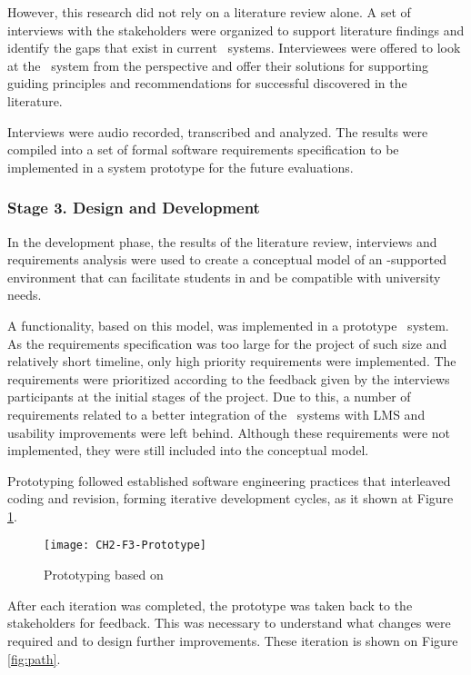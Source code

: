 However, this research did not rely on a literature review alone. A set of
interviews with the stakeholders were organized to support literature findings
and identify the gaps that exist in current \ep~systems. Interviewees were
offered to look at the \ep~system from the \LLLs perspective and offer their
solutions for supporting guiding principles and recommendations for successful
\LLLs discovered in the literature.

Interviews were audio recorded, transcribed and analyzed. The results were
compiled into a set of formal software requirements specification to be
implemented in a system prototype for the future evaluations.

\subsubsection{Stage 3. Design and Development}

In the development phase, the results of the literature review, interviews and
requirements analysis were used to create a conceptual model of an \ep-supported
environment that can facilitate students in \LLLs and be compatible with
university needs.

A functionality, based on this model, was implemented in a prototype \ep~system.
As the requirements specification was too large for the project of such size and
relatively short timeline, only high priority requirements were implemented. The
requirements were prioritized according to the feedback given by the interviews
participants at the initial stages of the project. Due to this, a number of
requirements related to a better integration of the \ep~systems with LMS and
usability improvements were left behind. Although these requirements were not
implemented, they were still included into the conceptual model.

Prototyping followed established software engineering practices that interleaved
coding and revision, forming iterative development cycles, as it shown at Figure
\ref{fig:prototype}.

\begin{figure}[htb]
\centering
\texttt{[image: CH2-F3-Prototype]}
\caption[Prototyping]{Prototyping based on \citet*[p.~411]{Sommerville2007}}
\label{fig:prototype}
\end{figure}

After each iteration was completed, the prototype was taken back to the
stakeholders for feedback. This was necessary to understand what changes were
required and to design further improvements. These iteration is shown on Figure
\ref{fig:path}.

